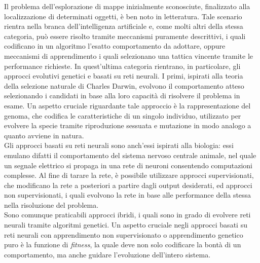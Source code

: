 Il problema dell'esplorazione di mappe inizialmente sconosciute, finalizzato 
alla
localizzazione di determinati oggetti, è ben noto in letteratura. Tale scenario
rientra nella branca dell'intelligenza
artificiale e, come molti altri della stessa categoria, può essere
risolto tramite meccanismi puramente descrittivi, i quali 
codificano in un
algoritmo l'esatto comportamento da adottare, oppure meccanismi di apprendimento
i quali selezionano una tattica vincente tramite le performance richieste. In
quest'ultima categoria rientrano, in particolare, gli approcci evolutivi genetici
e basati su reti neurali. I primi, ispirati alla teoria della selezione naturale
di Charles Darwin, evolvono il comportamento atteso selezionando i candidati in
base alla loro capacità di risolvere il problema in esame. Un aspetto cruciale
riguardante tale approccio è la rappresentazione del genoma, che codifica le
caratteristiche di un singolo individuo, utilizzato per evolvere la specie
tramite riproduzione sessuata e mutazione in modo analogo a quanto avviene in
natura.\\

Gli approcci basati su reti neurali sono anch'essi ispirati alla biologia:
essi emulano difatti il comportamento del sistema nervoso centrale animale, nel
quale un segnale elettrico si propaga in una rete di neuroni
consentendo computazioni complesse. Al fine di tarare la rete, è possibile
utilizzare approcci supervisionati, che modificano la rete a posteriori a
partire dagli output desiderati, ed approcci non supervisionati, i quali
evolvono la rete in base alle performance della stessa nella risoluzione del
problema.\\

Sono comunque praticabili approcci ibridi, i quali sono in grado di evolvere
reti neurali tramite algoritmi genetici. Un aspetto cruciale negli approcci
basati su reti neurali con apprendimento non supervisionato o
apprendimento genetico puro è la funzione di \emph{fitness}, la quale deve non
solo codificare la bontà di un comportamento, ma anche guidare l'evoluzione
dell'intero sistema.
